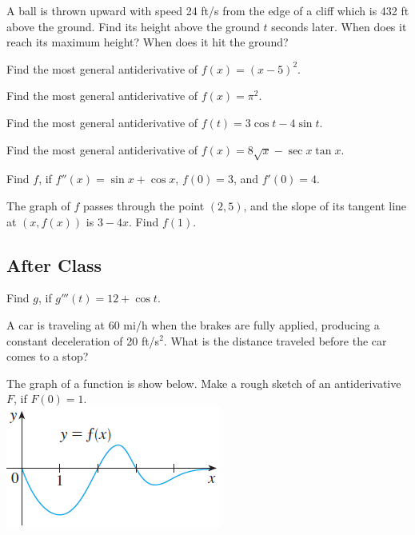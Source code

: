 \documentclass[notes]{subfiles}
\begin{document}
		\begin{ex}
			A ball is thrown upward with speed 24 ft/s from the edge of a cliff which is 432 ft above the ground.  Find its height above the ground $t$ seconds later.  When does it reach its maximum height?  When does it hit the ground?
		\end{ex}
			
		\begin{ex}
			Find the most general antiderivative of $f(x) = (x-5)^2$.
		\end{ex}
			
		\begin{ex}
			Find the most general antiderivative of $f(x) = \pi^2$.
		\end{ex}
	
		\begin{ex}
			Find the most general antiderivative of $f(t) = 3\cos t - 4\sin t$.
		\end{ex}
			\newpage
			
		\begin{ex}
			Find the most general antiderivative of $f(x) = 8\sqrt{x}-\sec x\tan x$.
		\end{ex}
			
		\begin{ex}
			Find $f$, if $f''(x) = \sin x + \cos x$, $f(0) = 3$, and $f'(0)= 4$.
		\end{ex}
		
		\begin{ex}
			The graph of $f$ passes through the point $(2,5)$, and the slope of its tangent line at $(x,f(x))$ is $3-4x$.  Find $f(1)$.
		\end{ex}
			\newpage
			
	\subsection*{After Class}		
		\begin{ex}
			Find $g$, if $g'''(t) = 12+\cos t$.
		\end{ex}
		
		\begin{ex}
			A car is traveling at 60 mi/h when the brakes are fully applied, producing a constant deceleration of 20 ft/s$^2$.  What is the distance traveled before the car comes to a stop?
		\end{ex}	
			
		\begin{ex}
			The graph of a function is show below.  Make a rough sketch of an antiderivative $F$, if $F(0) = 1$.\\
			\includegraphics{3.9fig1}
		\end{ex}
			
	\clearpage
\end{document}
